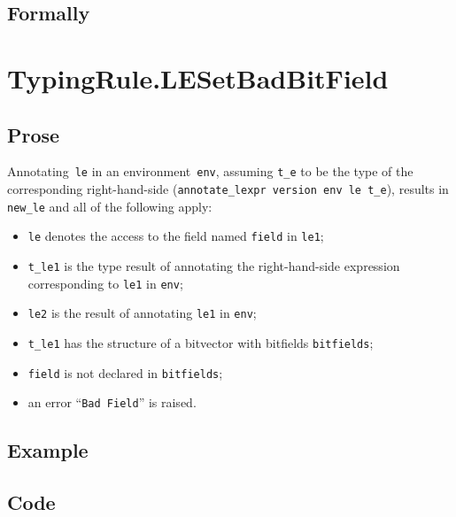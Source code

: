 \documentclass{book}
\begin{document}
\begin{emptyformal}
    \subsection{Formally}
\end{emptyformal}


\section{TypingRule.LESetBadBitField \label{sec:TypingRule.LESetBadBitField}}

    \subsection{Prose}
   Annotating~\texttt{le} in an environment~\texttt{env}, assuming
\texttt{t\_e} to be the type of the corresponding right-hand-side
(\texttt{annotate\_lexpr version env le t\_e}), results in \texttt{new\_le} and
all of the following apply:
   \begin{itemize}
   \item \texttt{le} denotes the access to the field named \texttt{field} in \texttt{le1};
   \item \texttt{t\_le1} is the type result of annotating the right-hand-side expression corresponding to \texttt{le1} in \texttt{env};
   \item \texttt{le2} is the result of annotating \texttt{le1} in \texttt{env};
   \item \texttt{t\_le1} has the structure of a bitvector with bitfields \texttt{bitfields};
   \item \texttt{field} is not declared in \texttt{bitfields};
   \item an error ``\texttt{Bad Field}'' is raised.  
   \end{itemize}

  \subsection{Example}

  \subsection{Code}
\end{document}

